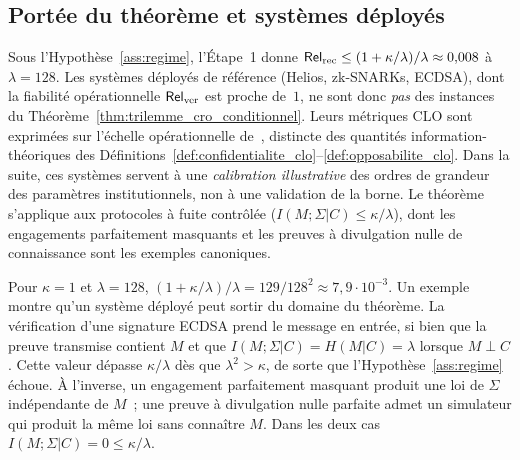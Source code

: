 \subsection{Port\'ee du th\'eor\`eme et syst\`emes d\'eploy\'es}
\label{subsec:portee_trilemme}
\begin{remark}\label{rem:portee_cas_etude}
Sous l'Hypoth\`ese~\ref{ass:regime}, l'\'Etape~1 donne
$\mathsf{Rel}_{\mathrm{rec}} \leq (1+\kappa/\lambda)/\lambda \approx 0{,}008$ \`a $\lambda = 128$.
Les syst\`emes d\'eploy\'es de r\'ef\'erence (Helios, zk-SNARKs, ECDSA),
dont la fiabilit\'e op\'erationnelle $\mathsf{Rel}_{\mathrm{ver}}$ est proche de~$1$, ne sont donc
\emph{pas} des instances du Th\'eor\`eme~\ref{thm:trilemme_cro_conditionnel}.
Leurs m\'etriques CLO sont exprim\'ees sur l'\'echelle op\'erationnelle
de~\cite{MINKA2026CLO}, distincte des quantit\'es information-th\'eoriques des
D\'efinitions~\ref{def:confidentialite_clo}--\ref{def:opposabilite_clo}. Dans
la suite, ces syst\`emes servent \`a une \emph{calibration illustrative} des
ordres de grandeur des param\`etres institutionnels, non \`a une
validation de la borne. Le th\'eor\`eme s'applique aux protocoles \`a fuite
contr\^ol\'ee ($I(M;\Sigma|C) \leq \kappa/\lambda$), dont les engagements
parfaitement masquants et les preuves \`a divulgation nulle de connaissance
sont les exemples canoniques.
\end{remark}

\begin{Preuve}
Pour $\kappa = 1$ et $\lambda = 128$, $(1+\kappa/\lambda)/\lambda = 129/128^2
\approx 7{,}9\cdot10^{-3}$. Un exemple montre qu'un syst\`eme d\'eploy\'e peut sortir
du domaine du th\'eor\`eme. La v\'erification d'une signature ECDSA prend le
message en entr\'ee, si bien que la preuve transmise contient $M$ et que
$I(M;\Sigma|C) = H(M|C) = \lambda$ lorsque $M \perp C$. Cette valeur d\'epasse
$\kappa/\lambda$ d\`es que $\lambda^2 > \kappa$, de sorte que
l'Hypoth\`ese~\ref{ass:regime} \'echoue. \`A l'inverse, un engagement parfaitement
masquant produit une loi de $\Sigma$ ind\'ependante de $M$~; une preuve \`a
divulgation nulle parfaite admet un simulateur qui produit la m\^eme loi sans
conna\^itre $M$. Dans les deux cas $I(M;\Sigma|C) = 0 \leq \kappa/\lambda$.
\end{Preuve}

